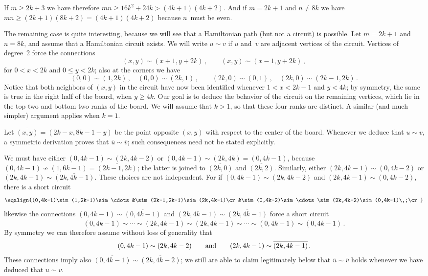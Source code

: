 If $m\ge2k+3$ we have therefore $mn\ge16k^2+24k>(4k+1)(4k+2)$. And if
$m=2k+1$ and $n\ne8k$ we have $mn\ge(2k+1)(8k+2)=(4k+1)(4k+2)$ because
$n$~must be even.

The remaining case is quite interesting, because we will see that a
Hamiltonian path (but not a circuit) is possible. Let $m=2k+1$ and $n=8k$,
and assume that a Hamiltonian circuit exists. We will write $u\sim v$ if $u$
and~$v$ are adjacent vertices of the circuit. Vertices of degree~2 force the
connections
$$(x,y)\sim(x+1,y+2k)\,,\qquad (x,y)\sim(x-1,y+2k)\,,$$
for $0<x<2k$ and $0\le y<2k$; also at the corners we have
$$(0,0)\sim(1,2k)\,,\quad(0,0)\sim(2k,1)\,,\qquad
  (2k,0)\sim(0,1)\,,\quad(2k,0)\sim(2k-1,2k)\,.$$
Notice that both neighbors of $(x,y)$ in the circuit have now been identified
whenever $1<x<2k-1$ and $y<4k$; by symmetry, the same is true in the right
half of the board, when $y\ge4k$. Our goal is to deduce the behavior of the
circuit on the remaining vertices, which lie in the top two and bottom two
ranks of the board. We will assume that $k>1$, so that these four ranks are
distinct. A similar (and much simpler) argument applies when $k=1$.

\def\ol(#1){\overline{(#1)}}
Let $\ol(x,y)=(2k-x,8k-1-y)$ be the point opposite $(x,y)$ with respect to
the center of the board. Whenever we deduce that $u\sim v$, a symmetric
derivation proves that $\overline u\sim\overline v$; such consequences need
not be stated explicitly.

We must have either $(0,4k-1)\sim(2k,4k-2)$ or
$(0,4k-1)\sim(2k,4k)=\ol(0,4k-1)$, because
$(0,4k-1)\not\sim(1,6k-1)=\ol(2k-1,2k)$; the latter is joined to
$\ol(2k,0)$ and $\ol(2k,2)$. Similarly, either $(2k,4k-1)\sim(0,4k-2)$ or
$(2k,4k-1)\sim\ol(2k,4k-1)$. These choices are not independent. For if
$(0,4k-1)\sim(2k,4k-2)$ and $(2k,4k-1)\sim(0,4k-2)$, there is a short circuit
$$\eqalign{(0,4k-1)\sim(1,2k-1)\sim\cdots&\sim(2k-1,2k-1)\sim(2k,4k-1)\cr
 &\sim(0,4k-2)\sim\cdots\sim(2k,4k-2)\sim(0,4k-1)\,;\cr}$$
likewise the connections $(0,4k-1)\sim\ol(0,4k-1)$ and $(2k,4k-1)\sim
\ol(2k,4k-1)$ force a short circuit
$$(0,4k-1)\sim\cdots\sim(2k,4k-1)\sim\ol(2k,4k-1)\sim\cdots\sim
 \ol(0,4k-1)\sim(0,4k-1)\,.$$
By symmetry we can therefore assume without loss of generality that
$$(0,4k-1)\sim(2k,4k-2)\qquad\hbox{and}\qquad(2k,4k-1)\sim\ol(2k,4k-1)\,.$$
These connections imply also $\ol(0,4k-1)\sim\ol(2k,4k-2)$; we still are
able to claim legitimately below that $\overline u\sim\overline v$ holds
whenever we have deduced that $u\sim v$.

